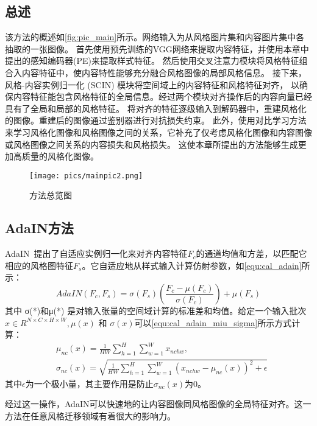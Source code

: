 \subsection{总述}
\par 该方法的概述如\autoref{fig:pic_main}所示。网络输入为从风格图片集和内容图片集中各抽取的一张图像。
首先使用预先训练的VGG网络来提取内容特征，并使用本章中提出的感知编码器(PE)来提取样式特征。
然后使用交叉注意力模块将风格特征组合入内容特征中，使内容特性能够充分融合风格图像的局部风格信息。
接下来，风格-内容实例归一化 (SCIN) 模块将空间域上的内容特征和风格特征对齐，
以确保内容特征能包含风格特征的全局信息。经过两个模块对齐操作后的内容向量已经具有了全局和局部的风格特征。
将对齐的特征逐级输入到解码器中，重建风格化的图像。重建后的图像通过鉴别器进行对抗损失约束。
此外，使用对比学习方法来学习风格化图像和风格图像之间的关系，它补充了仅考虑风格化图像和内容图像或风格图像之间关系的内容损失和风格损失。
这使本章所提出的方法能够生成更加高质量的风格化图像。
\begin{figure}[htbp]
    \centering
    \texttt{[image: pics/mainpic2.png]}
    \caption{\label{fig:pic_main}方法总览图}
\end{figure}
\subsection{AdaIN方法}
AdaIN~\cite{huang2017arbitrary}提出了自适应实例归一化来对齐内容特征$F_c$的通道均值和方差，以匹配它相应的风格图特征$F_s$。它自适应地从样式输入计算仿射参数，如\autoref{equ:cal_adain}所示：
\begin{equation}
    \label{equ:cal_adain}
    AdaIN(F_c,F_s)=\sigma(F_s)\left(\frac{F_c-\mu(F_c)}{\sigma(F_c)}\right)+\mu(F_s)
\end{equation}
其中 σ(*)和μ(*) 是对输入张量的空间域计算的标准差和均值。给定一个输入批次$x\in R^{N\times C\times H\times W},\mu(x)\text{ 和 }\sigma(x)$可以\autoref{equ:cal_adain_miu_sigma}所示方式计算：
\begin{equation}
    \label{equ:cal_adain_miu_sigma}
    \begin{aligned}
        &\mu_{nc}(x) =\frac1{HW}\sum_{h=1}^H\sum_{w=1}^Wx_{nchw}, \\
        &\sigma_{nc}(x) =\sqrt{\frac1{HW}\sum_{h=1}^H\sum_{w=1}^W\left(x_{nchw}-\mu_{nc}(x)\right)^2+\epsilon} 
        \end{aligned}
\end{equation}
其中$\epsilon$为一个极小量，其主要作用是防止$\sigma_{nc} (x)$为0。
\par 经过这一操作，AdaIN可以快速地的让内容图像同风格图像的全局特征对齐。这一方法在任意风格迁移领域有着很大的影响力。

